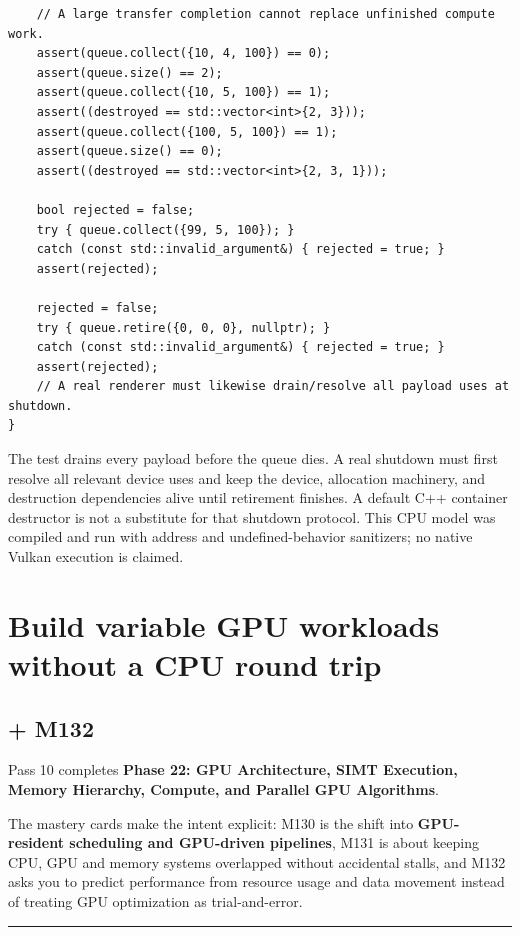 \begin{verbatim}
    // A large transfer completion cannot replace unfinished compute work.
    assert(queue.collect({10, 4, 100}) == 0);
    assert(queue.size() == 2);
    assert(queue.collect({10, 5, 100}) == 1);
    assert((destroyed == std::vector<int>{2, 3}));
    assert(queue.collect({100, 5, 100}) == 1);
    assert(queue.size() == 0);
    assert((destroyed == std::vector<int>{2, 3, 1}));

    bool rejected = false;
    try { queue.collect({99, 5, 100}); }
    catch (const std::invalid_argument&) { rejected = true; }
    assert(rejected);

    rejected = false;
    try { queue.retire({0, 0, 0}, nullptr); }
    catch (const std::invalid_argument&) { rejected = true; }
    assert(rejected);
    // A real renderer must likewise drain/resolve all payload uses at shutdown.
}
\end{verbatim}

The test drains every payload before the queue dies. A real shutdown must first resolve all relevant device uses and keep the device, allocation machinery, and destruction dependencies alive until retirement finishes. A default C++ container destructor is not a substitute for that shutdown protocol. This CPU model was compiled and run with address and undefined-behavior sanitizers; no native Vulkan execution is claimed.

\section{Build variable GPU workloads without a CPU round trip}\label{01-foundations-i-ch011-build-variable-gpu-workloads-without-a-cpu-round-trip}

\subsection{+ M132}\label{01-foundations-i-ch011-m132}

Pass 10 completes \textbf{Phase 22: GPU Architecture, SIMT Execution, Memory Hierarchy, Compute, and Parallel GPU Algorithms}.

The mastery cards make the intent explicit: M130 is the shift into \textbf{GPU-resident scheduling and GPU-driven pipelines}, M131 is about keeping CPU, GPU and memory systems overlapped without accidental stalls, and M132 asks you to predict performance from resource usage and data movement instead of treating GPU optimization as trial-and-error.

\begin{center}\rule{0.5\linewidth}{0.5pt}\end{center}


